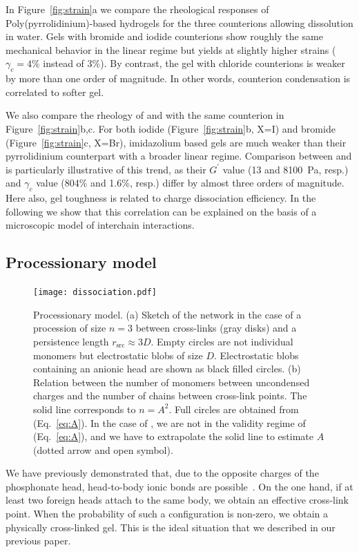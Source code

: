 \documentclass[journal=jacsat,manuscript=article]{achemso}
\begin{document}
In Figure~\ref{fig:strain}a we compare the rheological responses of Poly(pyrrolidinium)-based hydrogels for the three counterions allowing dissolution in water. Gels with bromide and iodide counterions show roughly the same mechanical behavior in the linear regime but  yields at slightly higher strains ($\gamma_c=4\%$ instead of $3\%$). By contrast, the gel with chloride counterions is weaker by more than one order of magnitude. In other words, counterion condensation is correlated to softer gel.

We also compare the rheology of  and  with the same counterion  in Figure~\ref{fig:strain}b,c. For both iodide (Figure~\ref{fig:strain}b, X=I) and bromide (Figure~\ref{fig:strain}c, X=Br), imidazolium based gels are much weaker than their pyrrolidinium counterpart with a broader linear regime. Comparison between  and  is particularly illustrative of this trend, as their $G^\prime$ value (13 and \SI{8100}{\pascal}, resp.) and $\gamma_c$ value (804\% and 1.6\%, resp.) differ by almost three orders of magnitude. Here also, gel toughness is related to charge dissociation efficiency. In the following we show that this correlation can be explained on the basis of a microscopic model of interchain interactions.



\subsection{Processionary model}

\begin{figure}
\texttt{[image: dissociation.pdf]}
\caption{Processionary model. (a) Sketch of the network in the case of a procession of size $n=3$ between cross-links (gray disks) and a persistence length $r_\mathrm{src}\approx 3D$. Empty circles are not individual monomers but electrostatic blobs of size $D$. Electrostatic blobs containing an anionic head are shown as black filled circles. (b) Relation between the number of monomers between uncondensed charges and the number of chains between cross-link points. The solid line corresponds to $n = A^2$. Full circles are obtained from (Eq.~\ref{eq:A}). In the case of , we are not in the validity regime of (Eq.~\ref{eq:A}), and we have to extrapolate the solid line to estimate $A$ (dotted arrow and open symbol).}
\label{fig:dissociation}
\end{figure}

We have previously demonstrated that, due to the opposite charges of the phosphonate head, head-to-body ionic bonds are possible~\cite{Srour2014}. On the one hand, if at least two foreign heads attach to the same body, we obtain an effective cross-link point. When the probability of such a configuration is non-zero, we obtain a physically cross-linked gel. This is the ideal situation that we described in our previous paper.
\end{document}

